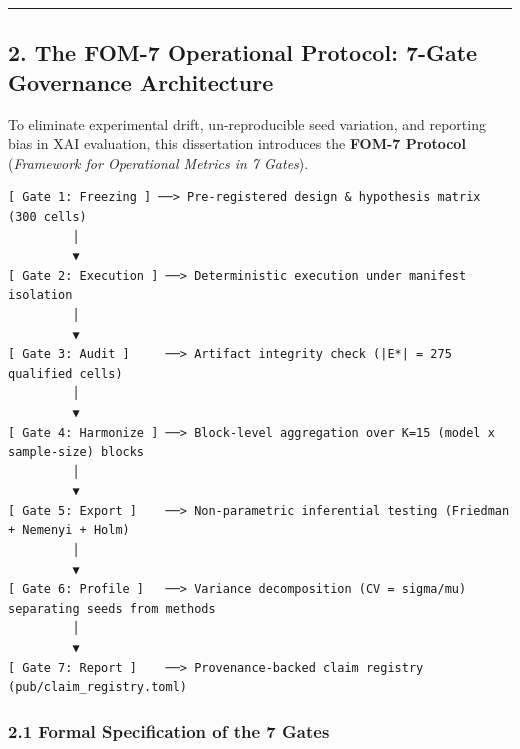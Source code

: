 \documentclass[
]{article}
\begin{document}
\begin{center}\rule{0.5\linewidth}{0.5pt}\end{center}

\subsection{2. The FOM-7 Operational Protocol: 7-Gate Governance
Architecture}\label{the-fom-7-operational-protocol-7-gate-governance-architecture}

To eliminate experimental drift, un-reproducible seed variation, and
reporting bias in XAI evaluation, this dissertation introduces the
\textbf{FOM-7 Protocol} (\emph{Framework for Operational Metrics in 7
Gates}).

\begin{verbatim}
[ Gate 1: Freezing ] ──> Pre-registered design & hypothesis matrix (300 cells)
         │
         ▼
[ Gate 2: Execution ] ──> Deterministic execution under manifest isolation
         │
         ▼
[ Gate 3: Audit ]     ──> Artifact integrity check (|E*| = 275 qualified cells)
         │
         ▼
[ Gate 4: Harmonize ] ──> Block-level aggregation over K=15 (model x sample-size) blocks
         │
         ▼
[ Gate 5: Export ]    ──> Non-parametric inferential testing (Friedman + Nemenyi + Holm)
         │
         ▼
[ Gate 6: Profile ]   ──> Variance decomposition (CV = sigma/mu) separating seeds from methods
         │
         ▼
[ Gate 7: Report ]    ──> Provenance-backed claim registry (pub/claim_registry.toml)
\end{verbatim}

\subsubsection{2.1 Formal Specification of the 7
Gates}\label{formal-specification-of-the-7-gates}
\end{document}
